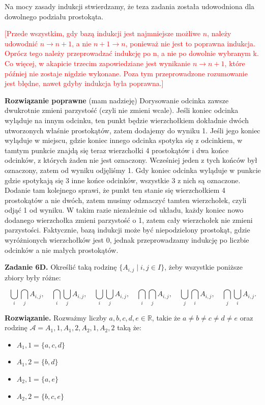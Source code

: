 \documentclass[a4paper, hidelinks, 12pt]{article}
\begin{document}
\medskip

Na mocy zasady indukcji stwierdzamy, że teza zadania została udowodniona dla dowolnego podziału prostokąta.

\textcolor{red}{[Przede wszystkim, gdy bazą indukcji jest najmniejsze możliwe $n$, należy udowodnić $n \rightarrow n+1$, a nie $n+1 \rightarrow n$, ponieważ nie jest to poprawna indukcja. Oprócz tego należy przeprowadzać indukcję po n, a nie po dowolnie wybranym k. Co więcej, w akapicie trzecim zapowiedziane jest wynikanie $n \rightarrow n+1$, które później nie zostaje nigdzie wykonane. Poza tym przeprowadzone rozumowanie jest błędne, nawet gdyby indukcja była poprawna.]}

\textbf{Rozwiązanie poprawne} (mam nadzieję) Dorysowanie odcinka zawsze dwukrotnie zmieni parzystość (czyli nie zmieni wcale). Jeśli koniec odcinka wyląduje na innym odcinku, ten punkt będzie wierzchołkiem dokładnie dwóch utworzonych właśnie prostokątów, zatem dodajemy do wyniku 1. Jeśli jego koniec wyląduje  w miejscu, gdzie koniec innego odcinka spotyka się z odcinkiem, w tamtym punkcie znajdą się teraz wierzchołki 4 prostokątów i dwa końce odcinków, z których żaden nie jest oznaczony. Wcześniej jeden z tych końców był oznaczony, zatem od wyniku odjęliśmy 1. Gdy koniec odcinka wyląduje w punkcie gdzie spotykają się 3 inne końce odcinków, wszystkie 3 z nich są oznaczone. Dodanie tam kolejnego sprawi, że punkt ten stanie się wierzchołkiem 4 prostokątów a nie dwóch, zatem musimy odznaczyć tamten wierzchołek, czyli odjąć 1 od wyniku. W takim razie niezależnie od układu, każdy koniec nowo dodanego wierzchołka zmieni parzystość o 1, zatem cały wierzchołek nie zmieni parzystości. Faktycznie, bazą indukcji może być niepodzielony prostokąt, gdzie wyróżnionych wierzchołków jest 0, jednak przeprowadzamy indukcję po liczbie odcinków a nie małych prostokątów.  


\textbf{Zadanie 6D.} Określić taką rodzinę $\{A_{i,j} \mid i, j \in I\}$, żeby wszystkie poniższe
zbiory były różne:

\[
\bigcup_{i} \bigcap_{j} A_{i,j}, \quad \bigcap_{i} \bigcup_{j} A_{i,j}, \quad \bigcup_{i} \bigcup_{j} A_{i,j}, \quad \bigcap_{i} \bigcap_{j} A_{i,j}, \quad \bigcup_{j} \bigcap_{i} A_{i,j}, \quad \bigcap_{j} \bigcup_{i} A_{i,j}.
\]


\textbf{Rozwiązanie.} Rozważmy liczby $a,b,c,d,e \in \mathbb{R}$, takie że $a\neq b \neq c \neq d \neq e $ oraz rodzinę $\mathcal{A} = A_1,1, A_1,2, A_2,1, A_2,2$ taką że: 
\begin{itemize}
    \item $A_1,1 = \{a, c, d\}$
    \item $A_1,2 = \{b, d\}$
    \item $A_2,1 = \{a, e\}$
    \item $A_2,2 = \{b, c, e\}$
\end{itemize}
\end{document}
